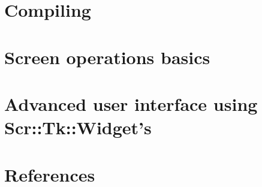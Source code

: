 \section{Compiling}

\cleardoublepage

\section{Screen operations basics}

\cleardoublepage

\section{Advanced user interface using Scr::Tk::Widget's}

\cleardoublepage



\section{References}

\cleardoublepage

\printindex
















